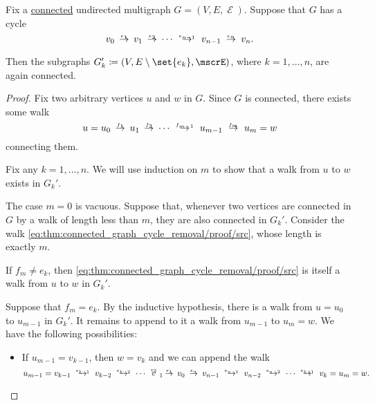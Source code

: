 \begin{proposition}\label{thm:connected_graph_cycle_removal}
  Fix a \hyperref[def:graph_connectedness/undirected]{connected} undirected multigraph \( G = (V, E, \mscrE) \). Suppose that \( G \) has a cycle
  \begin{equation*}
    v_0 \reloset {e_1} \to v_1 \reloset {e_2} \to \cdots \reloset {e_{n-1}} \to v_{n-1} \reloset {e_n} \to v_n.
  \end{equation*}

  Then the subgraphs \( G_k' \coloneqq (V, E \setminus \set{ e_k }, \mscrE) \), where \( k = 1, \ldots, n \), are again connected.
\end{proposition}
\begin{proof}
  Fix two arbitrary vertices \( u \) and \( w \) in \( G \). Since \( G \) is connected, there exists some walk
  \begin{equation}\label{eq:thm:connected_graph_cycle_removal/proof/src}
    u = u_0 \reloset {f_1} \to u_1 \reloset {f_2} \to \cdots \reloset {f_{m-1}} \to u_{m-1} \reloset {f_m} \to u_m = w
  \end{equation}
  connecting them.

  Fix any \( k = 1, \ldots, n \). We will use induction on \( m \) to show that a walk from \( u \) to \( w \) exists in \( G_k' \).

  The case \( m = 0 \) is vacuous. Suppose that, whenever two vertices are connected in \( G \) by a walk of length less than \( m \), they are also connected in \( G_k' \). Consider the walk \eqref{eq:thm:connected_graph_cycle_removal/proof/src}, whose length is exactly \( m \).

  If \( f_m \neq e_k \), then \eqref{eq:thm:connected_graph_cycle_removal/proof/src} is itself a walk from \( u \) to \( w \) in \( G_k' \).

  Suppose that \( f_m = e_k \). By the inductive hypothesis, there is a walk from \( u = u_0 \) to \( u_{m-1} \) in \( G_k' \). It remains to append to it a walk from \( u_{m-1} \) to \( u_m = w \). We have the following possibilities:
  \begin{itemize}
    \item If \( u_{m-1} = v_{k-1} \), then \( w = v_k \) and we can append the walk
    \begin{equation*}
      u_{m-1} = v_{k-1} \reloset {e_{k-1}} \to v_{k-2} \reloset {e_{k-2}} \to \cdots \reloset {e_2} v_1 \reloset {e_1} \to v_0 \reloset {e_n} \to v_{n-1} \reloset {e_{n-1}} \to v_{n-2} \reloset {e_{n-2}} \to \cdots \reloset {e_{k+1}} \to v_k = u_m = w.
    \end{equation*}


\end{itemize}
\end{proof}
